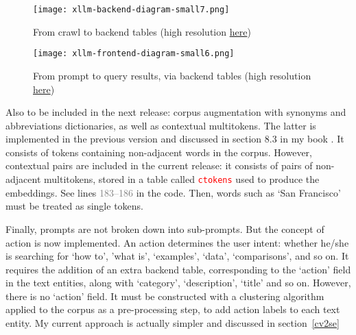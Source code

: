 \documentclass[10pt]{article}
\begin{document}
\begin{figure}[H]
\centering
\texttt{[image: xllm-backend-diagram-small7.png]}   
\caption{From crawl to backend tables (high resolution \href{https://drive.google.com/file/d/16as3x-PNnzjvczKVSZro3ir4bRVfb30j/view}{here})}
\label{fig:gre8uyehtw}
\end{figure}




\begin{figure}[H]
\centering
\texttt{[image: xllm-frontend-diagram-small6.png]}   
\caption{From prompt to query results, via backend tables (high resolution \href{https://drive.google.com/file/d/1eDS41Zqm8vLnDJdyIvUKfTvqLxKXTHNV/view}{here})}
\label{fig:greldsthh}
\end{figure}

Also to be included in the next release: corpus augmentation with synonyms and abbreviations dictionaries, as well as 
 contextual multitokens. The latter is implemented in the previous version and discussed in section 8.3 
in my book \cite{vgxllm}. It consists of tokens containing non-adjacent words in the corpus. However,
 contextual pairs are included in the current release: it consists of pairs of non-adjacent multitokens,
 stored in a table called \textcolor{red}{\texttt{ctokens}} used to produce the embeddings. See lines \textcolor{gray}{183--186} in the code.
 Then, words such as `San Francisco' must be treated as single tokens. 

Finally, prompts are not broken down into sub-prompts. But the concept of \textcolor{index}{action} is now implemented. 
An action determines the user intent: whether he/she is searching for `how to', 'what is', `examples', `data', `comparisons', and so on. 
It requires the addition of an extra backend table, corresponding to the `action' field in the text entities, along with `category', `description', `title' and so on. However, there is no `action' field. It must be constructed with a clustering algorithm applied to the corpus
 as a pre-processing step, to add action labels to
 each text entity. My current approach is actually simpler and discussed in section~\ref{cv2se}
\end{document}
